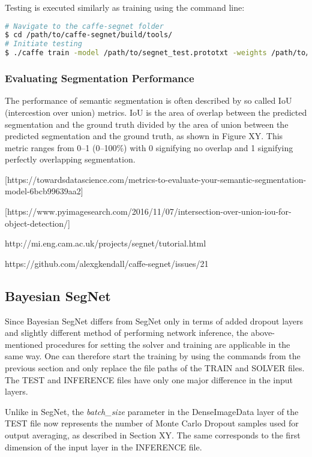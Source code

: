 Testing is executed similarly as training using the command line:

\begin{lstlisting}[language=bash]
# Navigate to the caffe-segnet folder
$ cd /path/to/caffe-segnet/build/tools/
# Initiate testing
$ ./caffe train -model /path/to/segnet_test.prototxt -weights /path/to/final_weights.caffemodel
\end{lstlisting}

\subsubsection{Evaluating Segmentation Performance}

The performance of semantic segmentation is often described by so called IoU (intercestion over union) metrics. IoU is the area of overlap between the predicted segmentation and the ground truth divided by the area of union between the predicted segmentation and the ground truth, as shown in Figure XY. This metric ranges from 0–1 (0–100\%) with 0 signifying no overlap and 1 signifying perfectly overlapping segmentation.

[https://towardsdatascience.com/metrics-to-evaluate-your-semantic-segmentation-model-6bcb99639aa2]

[https://www.pyimagesearch.com/2016/11/07/intersection-over-union-iou-for-object-detection/]

http://mi.eng.cam.ac.uk/projects/segnet/tutorial.html

https://github.com/alexgkendall/caffe-segnet/issues/21

\subsection{Bayesian SegNet}

Since Bayesian SegNet differs from SegNet only in terms of added dropout layers and slightly different method of performing network inference, the above-mentioned procedures for setting the solver and training are applicable in the same way. One can therefore start the training by using the commands from the previous section and only replace the file paths of the TRAIN and SOLVER files. The TEST and INFERENCE files have only one major difference in the input layers. 

Unlike in SegNet, the \textit{batch\_size} parameter in the DenseImageData layer of the TEST file now represents the number of Monte Carlo Dropout samples used for output averaging, as described in Section XY. The same corresponds to the first dimension of the input layer in the INFERENCE file.

